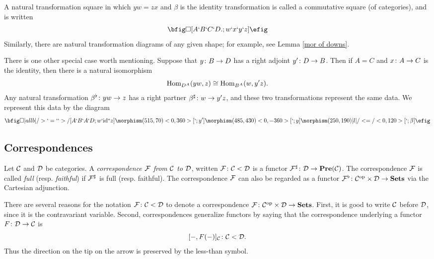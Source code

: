 \documentclass[10pt]{amsart}
\begin{document}
A natural transformation square in which $yw=zx$ and $\beta$ is the identity transformation is called a commutative square (of
categories), and is written $$\bfig\square[A`B`C`D.;w`x`y`z]\efig$$  Similarly, there are natural transformation diagrams of any
given shape; for example, see Lemma \ref{mor of downs}.

There is one other special case worth mentioning.  Suppose that $y\colon B\rightarrow D$ has a right adjoint $y'\colon D\rightarrow B$.  Then if $A=C$ and
$x\colon A\rightarrow C$ is the identity, then there is a natural isomorphism $$\textnormal{Hom}_{D^A}(yw,z)\cong\textnormal{Hom}_{B^A}(w,y'z).$$  Any natural
transformation
$\beta^\flat\colon yw\rightarrow z$ has a right partner $\beta^\sharp\colon w\rightarrow y'z$, and these
two transformations represent the same data.  We represent this data by the diagram $$\bfig
\square|allb|/>`=`{}`>/[A`B`A`D;w`\id``z]
\morphism(515,70)<0,360>[`;y']
\morphism(485,430)<0,-360>[`;y]
\morphism(250,190)|l|/<=/<0,120>[`;\beta]
\efig$$

\subsection{Correspondences}

\begin{definition}

Let $\mathcal{C}$ and $\mathcal{D}$ be categories.  A {\em correspondence $\mathcal{F}$ from $\mathcal{C}$ to $\mathcal{D}$}, written $\mathcal{F}\colon\mathcal{C}<\mathcal{D}$ is a functor
$\mathcal{F}^\sharp\colon\mathcal{D}\rightarrow{\bf Pre}(\mathcal{C})$.  The correspondence $\mathcal{F}$ is called {\em full} (resp. {\em faithful}) if $\mathcal{F}^\sharp$ is full (resp. faithful).  The correspondence $\mathcal{F}$ can also be regarded as a functor $\mathcal{F}^\flat\colon\mathcal{C}^\textnormal{op}\times\mathcal{D}\rightarrow{\bf Sets}$ via the Cartesian adjunction.

\end{definition}

\begin{remark}\label{not for corr}

There are several reasons for the notation $\mathcal{F}\colon\mathcal{C}<\mathcal{D}$ to denote a correspondence $\mathcal{F}\colon\mathcal{C}^\textnormal{op}\times\mathcal{D}\rightarrow{\bf Sets}$.  First, it is good to write $\mathcal{C}$ before $\mathcal{D}$, since it is the contravariant variable.  Second, correspondences generalize functors by saying that the correspondence underlying a functor $F\colon\mathcal{D}\rightarrow\mathcal{C}$ is $$[-,F(-)]_\mathcal{C}\colon\mathcal{C}<\mathcal{D}.$$  Thus the direction on the tip on the arrow is preserved by the less-than symbol.

\end{remark}
\end{document}
